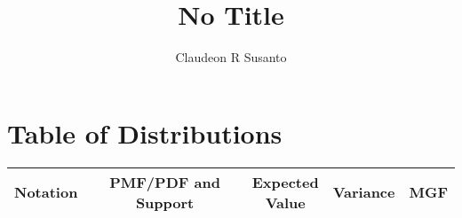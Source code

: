\documentclass{article}
\title{No Title}
\author{Claudeon R Susanto}
\date{}
\begin{document}
{}\selectfont




\section{Table of Distributions}
\begin{center}
\begin{tabular}{c|c|c|c|c}
Notation & PMF/PDF and Support & \makecell{Expected\\ Value} & Variance & MGF\\
\hline


\end{tabular}
\end{center}
\end{document}

